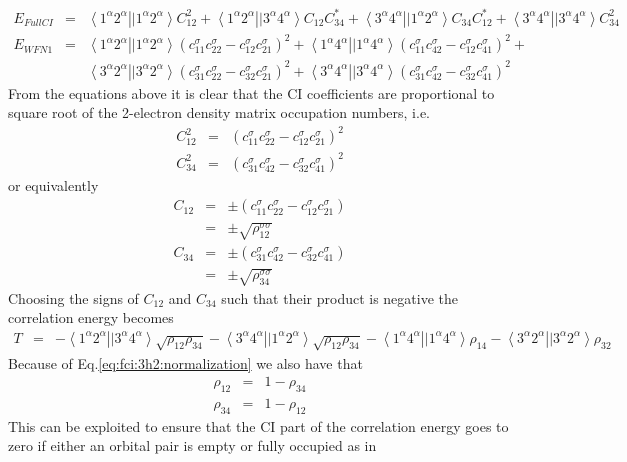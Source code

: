\documentclass[pra,nofootinbib]{revtex4-1}
\newcommand{\erib}[4]{\left\langle #1^\alpha #2^\alpha \right.\left|| #3^\alpha #4^\alpha \right\rangle}
\begin{document}
\begin{eqnarray}
  E_{FullCI} &=& \erib{1}{2}{1}{2}C_{12}^2 +
                 \erib{1}{2}{3}{4}C_{12}C_{34}^* +
                 \erib{3}{4}{1}{2}C_{34}C_{12}^* +
                 \erib{3}{4}{3}{4}C_{34}^2 \\
  E_{WFN1}
  &=& \erib{1}{2}{1}{2}
      (c_{11}^\sigma c_{22}^\sigma - c_{12}^\sigma c_{21}^\sigma)^2 +
      \erib{1}{4}{1}{4}
      (c_{11}^\sigma c_{42}^\sigma - c_{12}^\sigma c_{41}^\sigma)^2 + \\
  &&  \erib{3}{2}{3}{2}
      (c_{31}^\sigma c_{22}^\sigma - c_{32}^\sigma c_{21}^\sigma)^2 +
      \erib{3}{4}{3}{4}
      (c_{31}^\sigma c_{42}^\sigma - c_{32}^\sigma c_{41}^\sigma)^2
\end{eqnarray}
From the equations above it is clear that the CI coefficients are
proportional to square root of the 2-electron density matrix occupation
numbers, i.e.
\begin{eqnarray}
   C_{12}^2 &=& (c_{11}^\sigma c_{22}^\sigma - c_{12}^\sigma c_{21}^\sigma)^2 \\
   C_{34}^2 &=& (c_{31}^\sigma c_{42}^\sigma - c_{32}^\sigma c_{41}^\sigma)^2
\end{eqnarray}
or equivalently
\begin{eqnarray}
   C_{12} &=& \pm(c_{11}^\sigma c_{22}^\sigma - c_{12}^\sigma c_{21}^\sigma) \\
          &=& \pm \sqrt{\rho^{\sigma\sigma}_{12}} \\
   C_{34} &=& \pm(c_{31}^\sigma c_{42}^\sigma - c_{32}^\sigma c_{41}^\sigma) \\
          &=& \pm \sqrt{\rho^{\sigma\sigma}_{34}} 
\end{eqnarray}
Choosing the signs of $C_{12}$ and $C_{34}$ such that their product is 
negative the correlation energy becomes
\begin{eqnarray}
   T &=& -\erib{1}{2}{3}{4}\sqrt{\rho_{12}\rho_{34}}
         -\erib{3}{4}{1}{2}\sqrt{\rho_{12}\rho_{34}}
         -\erib{1}{4}{1}{4}\rho_{14}
         -\erib{3}{2}{3}{2}\rho_{32}
\end{eqnarray}
Because of Eq.\ref{eq:fci:3h2:normalization} we also have that
\begin{eqnarray}
   \rho_{12} &=& 1-\rho_{34} \\
   \rho_{34} &=& 1-\rho_{12}
\end{eqnarray}
This can be exploited to ensure that the CI part of the correlation energy
goes to zero if either an orbital pair is empty or fully occupied as in
\end{document}
